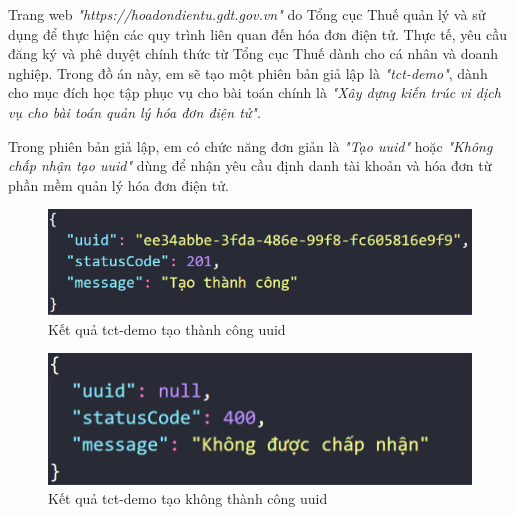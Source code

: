 Trang web \emph{"https://hoadondientu.gdt.gov.vn"} do Tổng cục Thuế quản lý và sử dụng để thực hiện các quy trình liên quan đến hóa đơn điện tử. Thực tế, yêu cầu đăng ký và phê duyệt chính thức từ Tổng cục Thuế dành cho cá nhân và doanh nghiệp. Trong đồ án này, em sẽ tạo một phiên bản giả lập là \emph{"tct-demo"}, dành cho mục đích học tập phục vụ cho bài toán chính là \emph{"Xây dựng kiến trúc vi dịch vụ cho bài toán quản lý hóa đơn điện tử"}.

Trong phiên bản giả lập, em có chức năng đơn giản là \emph{"Tạo uuid"} hoặc \emph{"Không chấp nhận tạo uuid"} dùng để nhận yêu cầu định danh tài khoản và hóa đơn từ phần mềm quản lý hóa đơn điện tử.

\begin{figure}[H]

\centering

\includegraphics[scale = 0.5]{pictures/_ket_qua_tao_thanh_cong_uuid/main.png}

\caption{Kết quả tct-demo tạo thành công uuid}

\end{figure}

\begin{figure}[H]

\centering

\includegraphics[scale = 0.5]{pictures/_ket_qua_tao_khong_thanh_cong_uuid/main.png}

\caption{Kết quả tct-demo tạo không thành công uuid}

\end{figure}